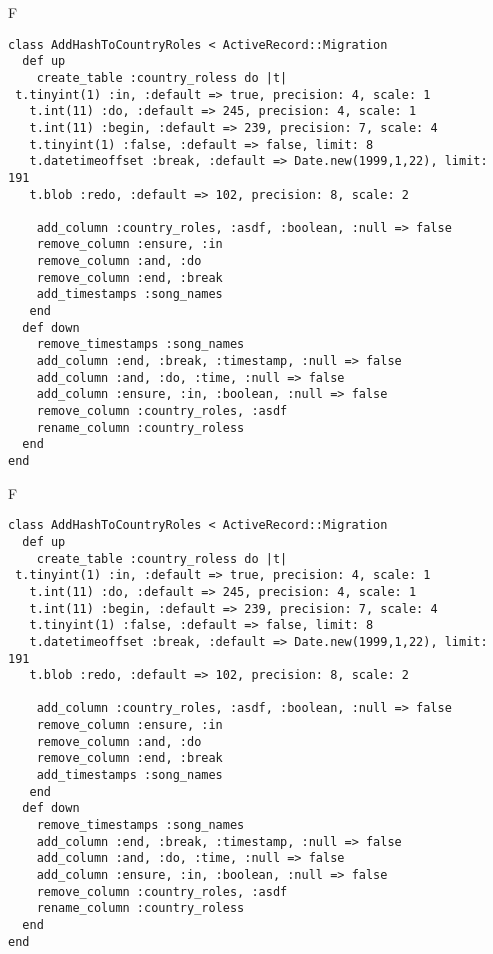 F
\begin{verbatim}
class AddHashToCountryRoles < ActiveRecord::Migration
  def up
    create_table :country_roless do |t| 
 t.tinyint(1) :in, :default => true, precision: 4, scale: 1
   t.int(11) :do, :default => 245, precision: 4, scale: 1
   t.int(11) :begin, :default => 239, precision: 7, scale: 4
   t.tinyint(1) :false, :default => false, limit: 8
   t.datetimeoffset :break, :default => Date.new(1999,1,22), limit: 191
   t.blob :redo, :default => 102, precision: 8, scale: 2

    add_column :country_roles, :asdf, :boolean, :null => false
    remove_column :ensure, :in
    remove_column :and, :do
    remove_column :end, :break
    add_timestamps :song_names
   end
  def down
    remove_timestamps :song_names
    add_column :end, :break, :timestamp, :null => false
    add_column :and, :do, :time, :null => false
    add_column :ensure, :in, :boolean, :null => false
    remove_column :country_roles, :asdf
    rename_column :country_roless
  end
end
\end{verbatim}

F
\begin{verbatim}
class AddHashToCountryRoles < ActiveRecord::Migration
  def up
    create_table :country_roless do |t| 
 t.tinyint(1) :in, :default => true, precision: 4, scale: 1
   t.int(11) :do, :default => 245, precision: 4, scale: 1
   t.int(11) :begin, :default => 239, precision: 7, scale: 4
   t.tinyint(1) :false, :default => false, limit: 8
   t.datetimeoffset :break, :default => Date.new(1999,1,22), limit: 191
   t.blob :redo, :default => 102, precision: 8, scale: 2

    add_column :country_roles, :asdf, :boolean, :null => false
    remove_column :ensure, :in
    remove_column :and, :do
    remove_column :end, :break
    add_timestamps :song_names
   end
  def down
    remove_timestamps :song_names
    add_column :end, :break, :timestamp, :null => false
    add_column :and, :do, :time, :null => false
    add_column :ensure, :in, :boolean, :null => false
    remove_column :country_roles, :asdf
    rename_column :country_roless
  end
end
\end{verbatim}

